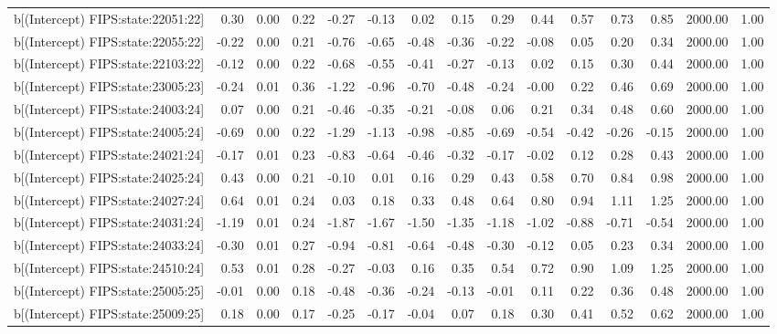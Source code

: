 \begin{table}[ht]
\begin{tabular}{rrrrrrrrrrrrrrr}
  b[(Intercept) FIPS:state:22051:22] & 0.30 & 0.00 & 0.22 & -0.27 & -0.13 & 0.02 & 0.15 & 0.29 & 0.44 & 0.57 & 0.73 & 0.85 & 2000.00 & 1.00 \\ 
  b[(Intercept) FIPS:state:22055:22] & -0.22 & 0.00 & 0.21 & -0.76 & -0.65 & -0.48 & -0.36 & -0.22 & -0.08 & 0.05 & 0.20 & 0.34 & 2000.00 & 1.00 \\ 
  b[(Intercept) FIPS:state:22103:22] & -0.12 & 0.00 & 0.22 & -0.68 & -0.55 & -0.41 & -0.27 & -0.13 & 0.02 & 0.15 & 0.30 & 0.44 & 2000.00 & 1.00 \\ 
  b[(Intercept) FIPS:state:23005:23] & -0.24 & 0.01 & 0.36 & -1.22 & -0.96 & -0.70 & -0.48 & -0.24 & -0.00 & 0.22 & 0.46 & 0.69 & 2000.00 & 1.00 \\ 
  b[(Intercept) FIPS:state:24003:24] & 0.07 & 0.00 & 0.21 & -0.46 & -0.35 & -0.21 & -0.08 & 0.06 & 0.21 & 0.34 & 0.48 & 0.60 & 2000.00 & 1.00 \\ 
  b[(Intercept) FIPS:state:24005:24] & -0.69 & 0.00 & 0.22 & -1.29 & -1.13 & -0.98 & -0.85 & -0.69 & -0.54 & -0.42 & -0.26 & -0.15 & 2000.00 & 1.00 \\ 
  b[(Intercept) FIPS:state:24021:24] & -0.17 & 0.01 & 0.23 & -0.83 & -0.64 & -0.46 & -0.32 & -0.17 & -0.02 & 0.12 & 0.28 & 0.43 & 2000.00 & 1.00 \\ 
  b[(Intercept) FIPS:state:24025:24] & 0.43 & 0.00 & 0.21 & -0.10 & 0.01 & 0.16 & 0.29 & 0.43 & 0.58 & 0.70 & 0.84 & 0.98 & 2000.00 & 1.00 \\ 
  b[(Intercept) FIPS:state:24027:24] & 0.64 & 0.01 & 0.24 & 0.03 & 0.18 & 0.33 & 0.48 & 0.64 & 0.80 & 0.94 & 1.11 & 1.25 & 2000.00 & 1.00 \\ 
  b[(Intercept) FIPS:state:24031:24] & -1.19 & 0.01 & 0.24 & -1.87 & -1.67 & -1.50 & -1.35 & -1.18 & -1.02 & -0.88 & -0.71 & -0.54 & 2000.00 & 1.00 \\ 
  b[(Intercept) FIPS:state:24033:24] & -0.30 & 0.01 & 0.27 & -0.94 & -0.81 & -0.64 & -0.48 & -0.30 & -0.12 & 0.05 & 0.23 & 0.34 & 2000.00 & 1.00 \\ 
  b[(Intercept) FIPS:state:24510:24] & 0.53 & 0.01 & 0.28 & -0.27 & -0.03 & 0.16 & 0.35 & 0.54 & 0.72 & 0.90 & 1.09 & 1.25 & 2000.00 & 1.00 \\ 
  b[(Intercept) FIPS:state:25005:25] & -0.01 & 0.00 & 0.18 & -0.48 & -0.36 & -0.24 & -0.13 & -0.01 & 0.11 & 0.22 & 0.36 & 0.48 & 2000.00 & 1.00 \\ 
  b[(Intercept) FIPS:state:25009:25] & 0.18 & 0.00 & 0.17 & -0.25 & -0.17 & -0.04 & 0.07 & 0.18 & 0.30 & 0.41 & 0.52 & 0.62 & 2000.00 & 1.00 \\ 

\end{tabular}
\end{table}
